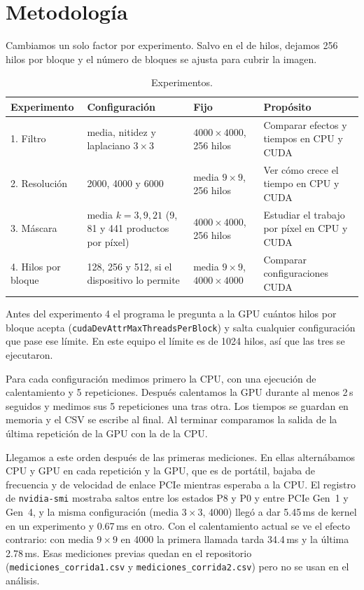 \documentclass[12pt]{article}
\begin{document}
\section{Metodología}\label{sec:metodologia}

Cambiamos un solo factor por experimento. Salvo en el de hilos, dejamos 256 hilos por bloque y
el número de bloques se ajusta para cubrir la imagen.

\begin{table}[H]
\centering
\caption{Experimentos.}
\small
\begin{tabular}{p{1.9cm}p{4.1cm}p{3.4cm}p{4.2cm}}
\toprule
Experimento & Configuración & Fijo & Propósito \\
\midrule
1. Filtro & media, nitidez y laplaciano $3\times3$ & $4000\times4000$, 256 hilos &
  Comparar efectos y tiempos en CPU y CUDA \\
2. Resolución & 2000, 4000 y 6000 & media $9\times9$, 256 hilos &
  Ver cómo crece el tiempo en CPU y CUDA \\
3. Máscara & media $k=3, 9, 21$ (9, 81 y 441 productos por píxel) & $4000\times4000$, 256 hilos &
  Estudiar el trabajo por píxel en CPU y CUDA \\
4. Hilos por bloque & 128, 256 y 512, si el dispositivo lo permite & media $9\times9$,
  $4000\times4000$ & Comparar configuraciones CUDA \\
\bottomrule
\end{tabular}
\end{table}

Antes del experimento 4 el programa le pregunta a la GPU cuántos hilos por bloque acepta
(\texttt{cudaDevAttrMaxThreadsPerBlock}) y salta cualquier configuración que pase ese límite.
En este equipo el límite es de 1024 hilos, así que las tres se ejecutaron.

Para cada configuración medimos primero la CPU, con una ejecución de calentamiento y 5
repeticiones. Después calentamos la GPU durante al menos 2\,s seguidos y medimos sus 5
repeticiones una tras otra. Los tiempos se guardan en memoria y el CSV se escribe al final. Al
terminar comparamos la salida de la última repetición de la GPU con la de la CPU.

Llegamos a este orden después de las primeras mediciones. En ellas alternábamos CPU y GPU en
cada repetición y la GPU, que es de portátil, bajaba de frecuencia y de velocidad de enlace
PCIe mientras esperaba a la CPU. El registro de \texttt{nvidia-smi} mostraba saltos entre los
estados P8 y P0 y entre PCIe Gen~1 y Gen~4, y la misma configuración (media $3\times3$, 4000)
llegó a dar 5.45\,ms de kernel en un experimento y 0.67\,ms en otro. Con el calentamiento
actual se ve el efecto contrario: con media $9\times9$ en 4000 la primera llamada tarda 34.4\,ms
y la última 2.78\,ms. Esas mediciones previas quedan en el repositorio
(\texttt{mediciones\_corrida1.csv} y \texttt{mediciones\_corrida2.csv}) pero no se usan en
el análisis.
\end{document}
